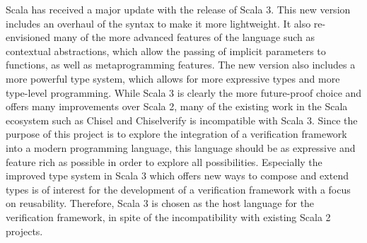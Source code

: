 Scala has received a major update with the release of Scala 3. This new version includes an overhaul of the syntax to
make it more lightweight. It also re-envisioned many of the more advanced features of the language such as contextual
abstractions, which allow the passing of implicit parameters to functions, as well as metaprogramming features. The
new version also includes a more powerful type system, which allows for more expressive types and more type-level
programming. While Scala 3 is clearly the more future-proof choice and offers many improvements over Scala 2, many of
the existing work in the Scala ecosystem such as Chisel and Chiselverify is incompatible with Scala 3. Since the
purpose of this project is to explore the integration of a verification framework into a modern programming language,
this language should be as expressive and feature rich as possible in order to explore all possibilities. Especially
the improved type system in Scala 3 which offers new ways to compose and extend types is of interest for the
development of a verification framework with a focus on reusability. Therefore, Scala 3 is chosen as the host
language for the verification framework, in spite of the incompatibility with existing Scala 2 projects.


